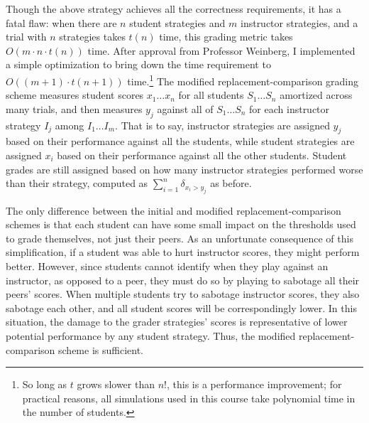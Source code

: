 \documentclass[pageno]{jpaper}
\begin{document}
Though the above strategy achieves all the correctness requirements, it has a fatal flaw: when there are $n$ student strategies and $m$ instructor strategies, and a trial with $n$ strategies takes $t(n)$ time, this grading metric takes $O(m \cdot n \cdot t(n))$ time.
After approval from Professor Weinberg, I implemented a simple optimization to bring down the time requirement to $O((m+1) \cdot t(n+1))$ time.\footnote{So long as $t$ grows slower than $n! $, this is a performance improvement; for practical reasons, all simulations used in this course take polynomial time in the number of students.}
The modified replacement-comparison grading scheme measures student scores $x_1 \ldots x_n$ for all students $S_1 \ldots S_n$ amortized across many trials, and then measures $y_j$ against all of $S_1 \ldots S_n$ for each instructor strategy $I_j$ among $I_1 \ldots I_m$.
That is to say, instructor strategies are assigned $y_j$ based on their performance against all the students, while student strategies are assigned $x_i$ based on their performance against all the other students.
Student grades are still assigned based on how many instructor strategies performed worse than their strategy, computed as $\sum\limits_{i=1}^n \delta_{x_i > y_j}$ as before.

The only difference between the initial and modified replacement-comparison schemes is that each student can have some small impact on the thresholds used to grade themselves, not just their peers.
As an unfortunate consequence of this simplification, if a student was able to hurt instructor scores, they might perform better.
However, since students cannot identify when they play against an instructor, as opposed to a peer, they must do so by playing to sabotage all their peers' scores.
When multiple students try to sabotage instructor scores, they also sabotage each other, and all student scores will be correspondingly lower.
In this situation, the damage to the grader strategies' scores is representative of lower potential performance by any student strategy.
Thus, the modified replacement-comparison scheme is sufficient.
\end{document}
